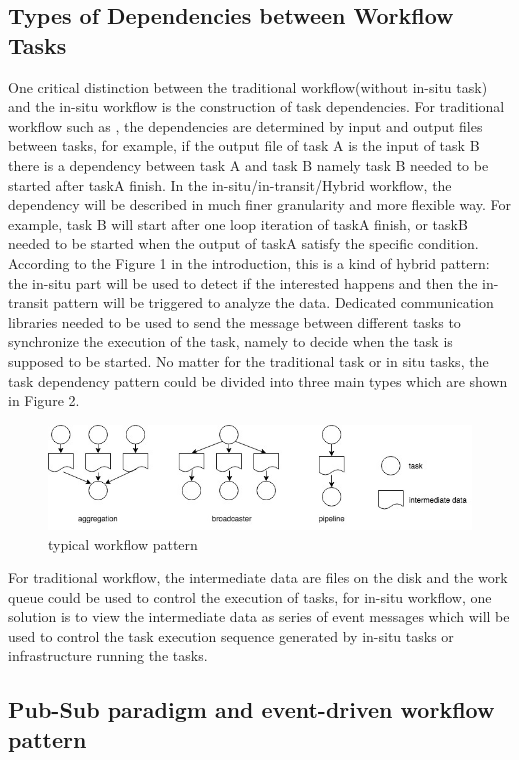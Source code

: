 \subsection{Types of Dependencies between Workflow Tasks}
One critical distinction between the traditional workflow(without in-situ task) and the in-situ workflow is the construction of task dependencies. For traditional workflow such as \cite{albrecht2012makeflow}, the dependencies are determined by input and output files between tasks, for example, if the output file of task A is the input of task B there is a dependency between task A and task B namely task B needed to be started after taskA finish.  In the in-situ/in-transit/Hybrid workflow, the dependency will be described in much finer granularity and more flexible way.  For example, task B will start after one loop iteration of taskA finish, or taskB needed to be started when the output of taskA satisfy the specific condition. According to the Figure 1 in the introduction, this is a kind of hybrid pattern: the in-situ part will be used to detect if the interested happens and then the in-transit pattern will be triggered to analyze the data. Dedicated communication libraries needed to be used to send the message between different tasks to synchronize the execution of the task, namely to decide when the task is supposed to be started. No matter for the traditional task or in situ tasks, the task dependency pattern could be divided into three main types \cite{albrecht2012makeflow,bharathi2008characterization} which are shown in Figure 2. 
\begin{figure} 
\centering
\includegraphics[width=.8\linewidth]{./figure/taskpattern.jpg}
\caption{typical workflow pattern}
 \label{fg:state}
\end{figure} 

For traditional workflow, the intermediate data are files on the disk and the work queue\cite{albrecht2012makeflow} could be used to control the execution of tasks,  for in-situ workflow, one solution is to view the intermediate data as series of event messages which will be used to control the task execution sequence generated by in-situ tasks or infrastructure running the tasks.

\subsection{Pub-Sub paradigm and event-driven workflow pattern}

